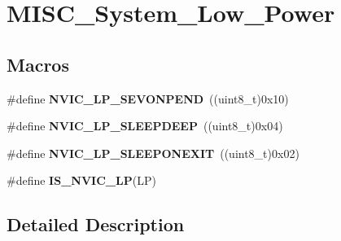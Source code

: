 \hypertarget{group___m_i_s_c___system___low___power}{\section{M\-I\-S\-C\-\_\-\-System\-\_\-\-Low\-\_\-\-Power}
\label{group___m_i_s_c___system___low___power}
}
\subsection*{Macros}
\begin{DoxyCompactItemize}
\item 
\hypertarget{group___m_i_s_c___system___low___power_ga10748d2b2875afd122f6476864ad6cae}{\#define {\bfseries N\-V\-I\-C\-\_\-\-L\-P\-\_\-\-S\-E\-V\-O\-N\-P\-E\-N\-D}~((uint8\-\_\-t)0x10)}\label{group___m_i_s_c___system___low___power_ga10748d2b2875afd122f6476864ad6cae}

\item 
\hypertarget{group___m_i_s_c___system___low___power_gaeec2d10922fa9ec5e65398667b303253}{\#define {\bfseries N\-V\-I\-C\-\_\-\-L\-P\-\_\-\-S\-L\-E\-E\-P\-D\-E\-E\-P}~((uint8\-\_\-t)0x04)}\label{group___m_i_s_c___system___low___power_gaeec2d10922fa9ec5e65398667b303253}

\item 
\hypertarget{group___m_i_s_c___system___low___power_ga368dc13a9c762a307c07cfa2e3ef59ad}{\#define {\bfseries N\-V\-I\-C\-\_\-\-L\-P\-\_\-\-S\-L\-E\-E\-P\-O\-N\-E\-X\-I\-T}~((uint8\-\_\-t)0x02)}\label{group___m_i_s_c___system___low___power_ga368dc13a9c762a307c07cfa2e3ef59ad}

\item 
\#define {\bfseries I\-S\-\_\-\-N\-V\-I\-C\-\_\-\-L\-P}(L\-P)
\end{DoxyCompactItemize}


\subsection{Detailed Description}


